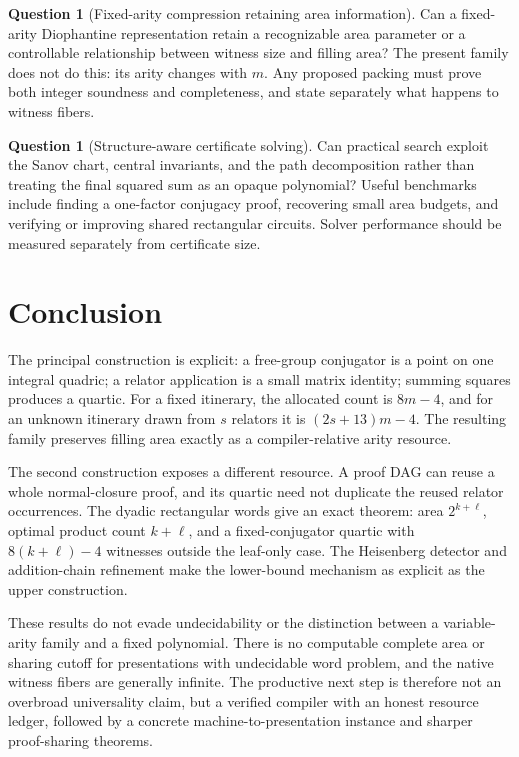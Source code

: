 \documentclass[11pt,letterpaper]{article}
\theoremstyle{definition}
\newtheorem{question}[theorem]{Question}
\theoremstyle{remark}
\begin{document}
\begin{question}[Fixed-arity compression retaining area information]\label{gts:vk:q:fixed-arity}
Can a fixed-arity Diophantine representation retain a recognizable area parameter or a controllable relationship between witness size and filling area? The present family does not do this: its arity changes with $m$. Any proposed packing must prove both integer soundness and completeness, and state separately what happens to witness fibers.
\end{question}

\begin{question}[Structure-aware certificate solving]\label{gts:vk:q:solving}
Can practical search exploit the Sanov chart, central invariants, and the path decomposition rather than treating the final squared sum as an opaque polynomial? Useful benchmarks include finding a one-factor conjugacy proof, recovering small area budgets, and verifying or improving shared rectangular circuits. Solver performance should be measured separately from certificate size.
\end{question}

\section{Conclusion}

The principal construction is explicit: a free-group conjugator is a point on one integral quadric; a relator application is a small matrix identity; summing squares produces a quartic. For a fixed itinerary, the allocated count is $8m-4$, and for an unknown itinerary drawn from $s$ relators it is $(2s+13)m-4$. The resulting family preserves filling area exactly as a compiler-relative arity resource.

The second construction exposes a different resource. A proof DAG can reuse a whole normal-closure proof, and its quartic need not duplicate the reused relator occurrences. The dyadic rectangular words give an exact theorem: area $2^{k+\ell}$, optimal product count $k+\ell$, and a fixed-conjugator quartic with $8(k+\ell)-4$ witnesses outside the leaf-only case. The Heisenberg detector and addition-chain refinement make the lower-bound mechanism as explicit as the upper construction.

These results do not evade undecidability or the distinction between a variable-arity family and a fixed polynomial. There is no computable complete area or sharing cutoff for presentations with undecidable word problem, and the native witness fibers are generally infinite. The productive next step is therefore not an overbroad universality claim, but a verified compiler with an honest resource ledger, followed by a concrete machine-to-presentation instance and sharper proof-sharing theorems.
\end{document}
